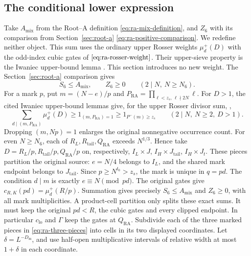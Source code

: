 \subsection{The conditional lower expression}

Take \(A_{\mathrm{mix}}\) from the Root--A definition
\eqref{eq:ra-mix-definition}, and \(Z_6\) with its comparison from
Section~\ref{sec:root-a} \eqref{eq:ra-positive-comparison}. We redefine neither object.
This sum uses the ordinary upper Rosser weights
\(\mu_d^+(D)\) with the odd-index cubic gates of
\(\eqref{eq:ra-rosser-weight}\). Their upper-sieve property is the
Iwaniec upper-bound lemma
\cite[Lemma~1, (3.2), (3.6)]{Iwaniec1980Rosser}
\cite[Lemmas~2--3, p.~313]{Iwaniec1980Remainder}. This section
introduces no new weight.
The Section~\ref{sec:root-a} comparison gives
\begin{equation}\label{eq:source-mixed-comparison}
 S_6\le A_{\mathrm{mix}},\qquad Z_6\ge0
 \qquad(2\mid N,\ N\ge N_6).
\end{equation}
For a mark \(p\), put \(m=(N-e)/p\) and
\(P_{\mathrm{RA}}=\prod_{\ell<z_s,\,\ell\nmid2N}\ell\).
For \(D>1\), the cited Iwaniec upper-bound lemmas give, for the upper
Rosser divisor sum,
\cite[Lemma~1, (3.2), (3.6)]{Iwaniec1980Rosser}
\cite[Lemmas~2--3, p.~313]{Iwaniec1980Remainder},
\[
 \sum_{d\mid(m,P_{\mathrm{RA}})}\mu_d^+(D)
 \ge1_{(m,P_{\mathrm{RA}})=1}\ge1_{P^-(m)\ge z_s}
 \qquad(2\mid N,\ N\ge2,\ D>1).
\]
Dropping \((m,Np)=1\) enlarges the original nonnegative occurrence count.
For even \(N\ge N_6\), each of \(R_L,R_{\mathrm{tail}},Q_{\mathrm{RA}}\) exceeds
\(N^{1/3}\). Hence take \(D=R_L/p,R_{\mathrm{tail}}/p,Q_{\mathrm{RA}}/p\) on,
respectively, \(I_L\times J\), \(I_H\times J_{\mathrm{tail}}\),
\(I_H\times J_t\). These pieces partition the original source: \(e=N/4\)
belongs to \(I_L\), and the shared mark endpoint belongs to
\(J_{\mathrm{tail}}\).
Since \(p\ge N^{t_0}>z_s\), the mark is unique in \(q=pd\).
The condition \(d\mid m\) is exactly \(e\equiv N\pmod{pd}\). The original gates give
\(c_{R,K}(pd)=\mu_d^+(R/p)\). Summation gives precisely
\(S_6\le A_{\mathrm{mix}}\) and \(Z_6\ge0\), with all mark
multiplicities. A product-cell partition only splits these exact
sums. It must keep the original \(pd<R\), the cubic gates and every clipped
endpoint. In particular \(c_{\mathrm{lo}}\) and \(\Gamma\) keep the
gates at \(Q_{\mathrm{RA}}\).
Subdivide each of the three marked pieces in
\eqref{eq:ra-three-pieces} into cells in its two displayed coordinates.
Let \(\delta=L^{-D_{\mathrm m}}\), and use half-open multiplicative
intervals of relative width at most \(1+\delta\) in each coordinate.
